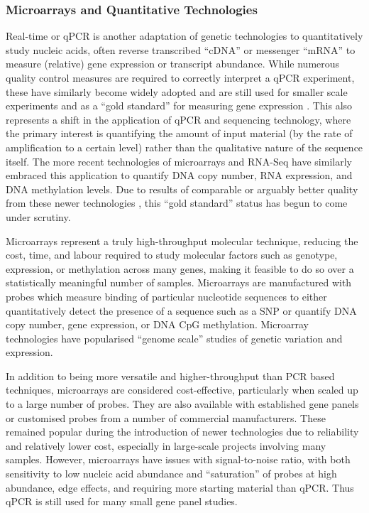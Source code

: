 \subsubsection{Microarrays and Quantitative Technologies}
Real-time or \gls{qPCR} is another adaptation of genetic technologies to quantitatively study nucleic acids, often reverse transcribed ``\gls{cDNA}'' or messenger ``\gls{mRNA}'' to measure (relative) gene expression or transcript abundance. While numerous quality control measures are required to correctly interpret a qPCR experiment, these have similarly become widely adopted and are still used for smaller scale experiments and as a ``gold standard'' for measuring gene expression \citep{Adamski2014}. This also represents a shift in the application of \gls{qPCR} and sequencing technology, where the primary interest is quantifying the amount of input material (by the rate of amplification to a certain level) rather than the qualitative nature of the sequence itself. The more recent technologies of microarrays and \gls{RNA-Seq} have similarly embraced this application to quantify DNA copy number, \gls{RNA} expression, and DNA methylation levels. Due to results of comparable or arguably better quality from these newer technologies \citep{Robin2016, Beck2016, McCourt2013, Git2010}, this ``gold standard'' status has begun to come under scrutiny.

Microarrays represent a truly high-throughput molecular technique, reducing the cost, time, and labour required to study molecular factors such as genotype, expression, or methylation across many genes, making it feasible to do so over a statistically meaningful number of samples. Microarrays are manufactured with probes which measure binding of particular nucleotide sequences to either quantitatively detect the presence of a sequence such as a \gls{SNP} or quantify DNA copy number, gene expression, or DNA CpG methylation. Microarray technologies have popularised ``genome scale'' studies of genetic variation and expression.

In addition to being more versatile and higher-throughput than \gls{PCR} based techniques, microarrays are considered cost-effective, particularly when scaled up to a large number of probes. They are also available with established gene panels or customised probes from a number of commercial manufacturers. These remained popular during the introduction of newer technologies due to reliability and relatively lower cost, especially in large-scale projects involving many samples. However, microarrays have issues with signal-to-noise ratio, with both sensitivity to low nucleic acid abundance and ``saturation'' of probes at high abundance, edge effects, and requiring more starting material than \gls{qPCR}. Thus \gls{qPCR} is still used for many small gene panel studies.

